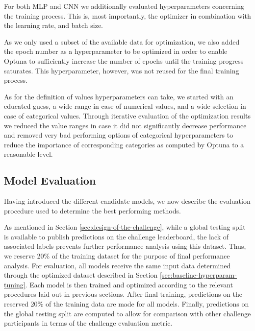 \documentclass[runningheads]{llncs}
\begin{document}
For both MLP and CNN we additionally evaluated hyperparameters concerning the training process. This is, most importantly, the optimizer in combination with the learning rate, and batch size.

As we only used a subset of the available data for optimization, we also added the epoch number as a hyperparameter to be optimized in order to enable Optuna to sufficiently increase the number of epochs until the training progress saturates. This hyperparameter, however, was not reused for the final training process. 


As for the definition of values hyperparameters can take, we started with an educated guess, a wide range in case of numerical values, and a wide selection in case of categorical values. Through iterative evaluation of the optimization results we reduced the value ranges in case it did not significantly decrease performance and removed very bad performing options of categorical hyperparameters to reduce the importance of corresponding categories as computed by Optuna to a reasonable level.










\subsection{Model Evaluation}

\label{sec:model-evaluation}

Having introduced the different candidate models, we now describe the evaluation procedure used to determine the best performing methods. 

As mentioned in Section \ref{sec:design-of-the-challenge}, while a global testing split is available to publish predictions on the challenge leaderboard, the lack of associated labels prevents further performance analysis using this dataset. Thus, we reserve 20\% of the training dataset for the purpose of final performance analysis.
For evaluation, all models receive the same input data determined through the optimized dataset described in Section \ref{sec:baseline-hyperparam-tuning}. Each model is then trained and optimized according to the relevant procedures laid out in previous sections. After final training, predictions on the reserved 20\% of the training data are made for all models. Finally, predictions on the global testing split are computed to allow for comparison with other challenge participants in terms of the challenge evaluation metric.
\end{document}

